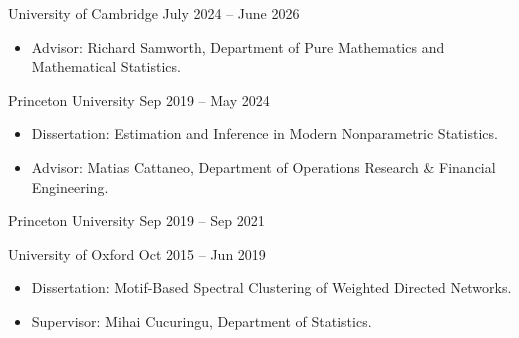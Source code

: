 \documentclass[
  date,
  number,
]{wgu-cv}
\begin{document}
\maketitle


\setlength{\emergencystretch}{2pt}


{University of Cambridge}
{July 2024 -- June 2026}

\begin{itemize}
  \item Advisor:
    Richard Samworth, Department of Pure Mathematics
    and Mathematical Statistics.
\end{itemize}

{Princeton University}
{Sep 2019 -- May 2024}

\begin{itemize}
  \item Dissertation:
    Estimation and Inference in Modern Nonparametric Statistics.
  \item Advisor:
    Matias Cattaneo, Department of Operations Research \& Financial Engineering.
\end{itemize}

{Princeton University}
{Sep 2019 -- Sep 2021}

\bigskip

{University of Oxford}
{Oct 2015 -- Jun 2019}

\begin{itemize}
  \item Dissertation:
    Motif-Based Spectral Clustering of Weighted Directed Networks.
  \item Supervisor:
    Mihai Cucuringu,
    Department of Statistics.
\end{itemize}

\vspace*{-4mm}

\end{document}
